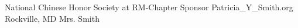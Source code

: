 

\begin{cvhonors}

  \cvreferences
    {National Chinese Honor Society at RM-Chapter Sponsor} %
    {Patricia\_Y\_Smith\@mcpsmd.org} %
    {Rockville, MD} %
    {Mrs. Smith} %

\end{cvhonors}
